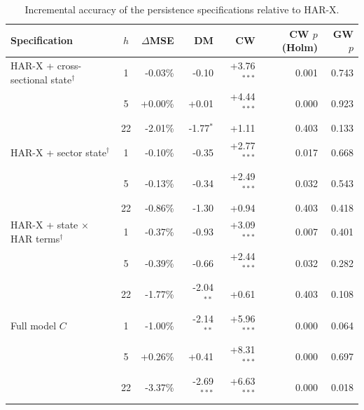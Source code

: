 \begin{table}[H]
\caption{Incremental accuracy of the persistence specifications relative to HAR-X.}
\label{tab:harx}
\footnotesize
\begin{tabularx}{\textwidth}{Xcrrrrr}
\toprule
Specification & $h$ & $\Delta$MSE & DM & CW & CW $p$ (Holm) & GW $p$ \\
\midrule
HAR-X + cross-sectional state$^{\dagger}$ & 1 & -0.03\% & -0.10 & +3.76$^{***}$ & 0.001 & 0.743 \\
 & 5 & +0.00\% & +0.01 & +4.44$^{***}$ & 0.000 & 0.923 \\
 & 22 & -2.01\% & -1.77$^{*}$ & +1.11 & 0.403 & 0.133 \\
\midrule
HAR-X + sector state$^{\dagger}$ & 1 & -0.10\% & -0.35 & +2.77$^{***}$ & 0.017 & 0.668 \\
 & 5 & -0.13\% & -0.34 & +2.49$^{***}$ & 0.032 & 0.543 \\
 & 22 & -0.86\% & -1.30 & +0.94 & 0.403 & 0.418 \\
\midrule
HAR-X + state $\times$ HAR terms$^{\dagger}$ & 1 & -0.37\% & -0.93 & +3.09$^{***}$ & 0.007 & 0.401 \\
 & 5 & -0.39\% & -0.66 & +2.44$^{***}$ & 0.032 & 0.282 \\
 & 22 & -1.77\% & -2.04$^{**}$ & +0.61 & 0.403 & 0.108 \\
\midrule
Full model $C$ & 1 & -1.00\% & -2.14$^{**}$ & +5.96$^{***}$ & 0.000 & 0.064 \\
 & 5 & +0.26\% & +0.41 & +8.31$^{***}$ & 0.000 & 0.697 \\
 & 22 & -3.37\% & -2.69$^{***}$ & +6.63$^{***}$ & 0.000 & 0.018 \\
\bottomrule
\end{tabularx}
\end{table}
